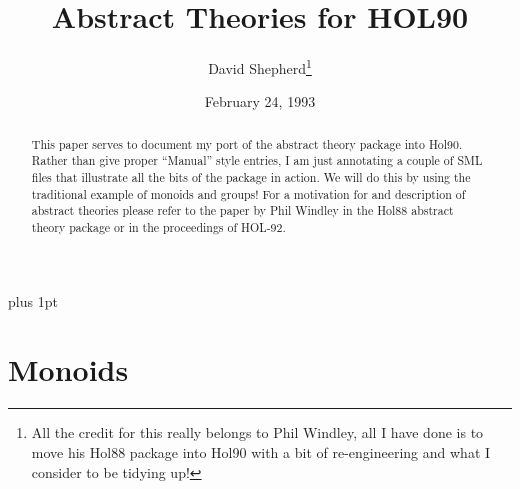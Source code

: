 %
%

\parindent=0pt
\baselineskip plus 1pt
\listparindent=0pt

\long{}

\def\quotation{\list{}{\listparindent 0pt
 \itemindent\listparindent
 \rightmargin\leftmargin\parsep 0.5\baselineskip plus 1pt}\item[]}

\def\@arrayparboxrestore{\let\par\@@par
    \let\-\@dischyph
    \let\'\@acci \let\`\@accii \let\=\@acciii
    \parindent\z@
    \parskip=0.5\baselineskip plus 1pt
    \everypar{}\linewidth\hsize 
    \@totalleftmargin\z@ \leftskip\z@ \rightskip\z@ \@rightskip\z@ 
    \parfillskip\@flushglue \lineskip\normallineskip 
    \baselineskip\normalbaselineskip\sloppy}

\title{Abstract Theories for HOL90}
\author{David Shepherd\thanks{All the credit for this really belongs to
Phil Windley, all I have done is to move his Hol88 package into Hol90
with a bit of re-engineering and what I consider to be tidying up!}}
\date{February 24, 1993}


\maketitle

\begin{abstract}
This paper serves to document my port of the abstract theory package
into Hol90. Rather than give proper ``Manual'' style entries, I am just
annotating a couple of SML files that illustrate all the bits of the
package in action. We will do this by using the traditional example of 
monoids and groups! For a motivation for and description of abstract
theories please refer to the paper by Phil Windley in the Hol88 abstract
theory package or in the proceedings of HOL-92.
\end{abstract}

\section{Monoids}

